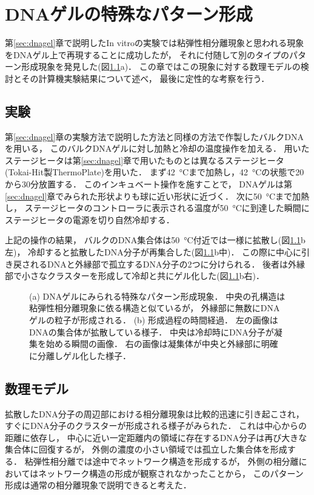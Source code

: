 \chapter{DNAゲルの特殊なパターン形成}

第\ref{sec:dnagel}章で説明したIn vitroの実験では粘弾性相分離現象と思われる現象をDNAゲル上で再現することに成功したが，
それに付随して別のタイプのパターン形成現象を発見した(図\ref{fig:result_special}a)．
この章ではこの現象に対する数理モデルの検討とその計算機実験結果について述べ，
最後に定性的な考察を行う．

\section{実験}
第\ref{sec:dnagel}章の実験方法で説明した方法と同様の方法で作製したバルクDNAを用いる，
このバルクDNAゲルに対し加熱と冷却の温度操作を加える．
用いたステージヒータは第\ref{sec:dnagel}章で用いたものとは異なるステージヒータ
(Tokai-Hit製ThermoPlate)を用いた．
まず\SI{42}{\celsius}まで加熱し，\SI{42}{\celsius}の状態で20から30分放置する．
このインキュベート操作を施すことで，
DNAゲルは第\ref{sec:dnagel}章でみられた形状よりも球に近い形状に近づく．
次に\SI{50}{\celsius}まで加熱し，
ステージヒータのコントローラに表示される温度が\SI{50}{\celsius}に到達した瞬間にステージヒータの電源を切り自然冷却する．

上記の操作の結果，
バルクのDNA集合体は\SI{50}{\celsius}付近では一様に拡散し(図\ref{fig:result_special}b左)，
冷却すると拡散したDNA分子が再集合した(図\ref{fig:result_special}b中)．
この際に中心に引き戻されるDNAと外縁部で孤立するDNA分子の2つに分けられる．
後者は外縁部で小さなクラスターを形成して冷却と共にゲル化した(図\ref{fig:result_special}b右)．

\begin{figure}
\centering

\caption{
    (a) DNAゲルにみられる特殊なパターン形成現象．
        中央の孔構造は粘弾性相分離現象に依る構造と似ているが，
        外縁部に無数にDNAゲルの粒子が形成される．
    (b) 形成過程の時間経過．
        左の画像はDNAの集合体が拡散している様子．
        中央は冷却時にDNA分子が凝集を始める瞬間の画像．
        右の画像は凝集体が中央と外縁部に明確に分離しゲル化した様子．
}
\label{fig:result_special}
\end{figure}

\section{数理モデル}
拡散したDNA分子の周辺部における相分離現象は比較的迅速に引き起こされ，
すぐにDNA分子のクラスターが形成される様子がみられた．
これは中心からの距離に依存し，
中心に近い一定距離内の領域に存在するDNA分子は再び大きな集合体に回復するが，
外側の濃度の小さい領域では孤立した集合体を形成する．
粘弾性相分離では途中でネットワーク構造を形成するが，
外側の相分離においてはネットワーク構造の形成が観察されなかったことから，
このパターン形成は通常の相分離現象で説明できると考えた．

